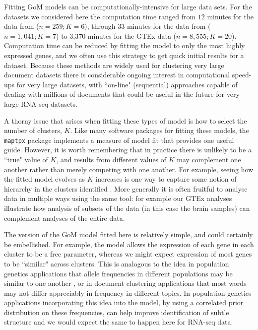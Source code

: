 \documentclass[10pt,letterpaper]{article}
\begin{document}
Fitting GoM models can be computationally-intensive for large data sets. For the datasets we considered here the computation time ranged from $12$ minutes for the data from \cite{Deng2014} ($n=259; K=6$), through $33$ minutes for the
data from \cite{Jaitin2014} ($n=1,041; K=7$) to 3,370 minutes for the GTEx data ($n=8,555; K=20$).
Computation time can be reduced by fitting the model to only the most highly expressed genes, and we often use this strategy to get quick initial results for a dataset.
Because these methods are widely used for clustering very large document datasets there is considerable ongoing interest in
computational speed-ups for very large datasets, with ``on-line" (sequential) approaches capable of dealing with millions of documents  \cite{Hoffman2010} that could be useful in the future for very large RNA-seq datasets.

A thorny issue that arises when fitting these types of model is how to select the number of clusters, $K$. Like many software packages
for fitting these models, the {\tt maptpx} package implements a measure of model fit that provides one useful guide. However, it is
worth remembering that in practice there is unlikely to be a ``true" value of $K$, and results from different
values of $K$ may complement one another rather than merely competing with one another. For example, seeing how the fitted model evolves
as $K$ increases is one way to capture some notion of hierarchy in the clusters identified \cite{Rosenberg2002}. More generally it is often
fruitful to analyse data in multiple ways using the same tool: for example our GTEx analyses illustrate how
analysis of subsets of the data (in this case the brain samples) can complement analyses of the entire data.

The version of the GoM model fitted here is relatively simple, and could certainly be embellished. For example,
the model allows the expression of each gene in each cluster to be a free parameter, whereas we might expect expression of most
genes to be ``similar" across clusters. This is analogous to the idea in population genetics applications that allele frequencies in different populations may
be similar to one another \cite{Falush2003}, or in document clustering applications that most words may not differ appreciably in frequency in different topics.
In population genetics applications incorporating this idea into the model, by using a correlated prior distribution on these frequencies,
can help improve identification of subtle structure \cite{Falush2003} and we would expect the same to happen here for RNA-seq data.
\end{document}
